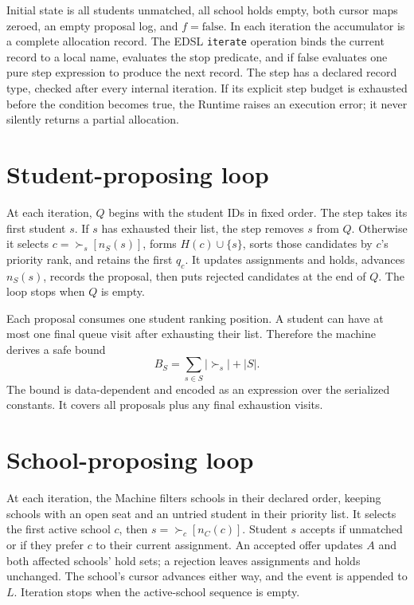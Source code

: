 \documentclass[11pt]{article}
\begin{document}
Initial state is all students unmatched, all school holds empty, both cursor maps zeroed, an empty proposal log, and $f=\text{false}$. In each iteration the accumulator is a complete allocation record. The EDSL \texttt{iterate} operation binds the current record to a local name, evaluates the stop predicate, and if false evaluates one pure step expression to produce the next record. The step has a declared record type, checked after every internal iteration. If its explicit step budget is exhausted before the condition becomes true, the Runtime raises an execution error; it never silently returns a partial allocation.

\section{Student-proposing loop}
At each iteration, $Q$ begins with the student IDs in fixed order. The step takes its first student $s$. If $s$ has exhausted their list, the step removes $s$ from $Q$. Otherwise it selects $c=\succ_s[n_S(s)]$, forms $H(c)\cup\{s\}$, sorts those candidates by $c$'s priority rank, and retains the first $q_c$. It updates assignments and holds, advances $n_S(s)$, records the proposal, then puts rejected candidates at the end of $Q$. The loop stops when $Q$ is empty.



Each proposal consumes one student ranking position. A student can have at most one final queue visit after exhausting their list. Therefore the machine derives a safe bound
\[
  B_S=\sum_{s\in S}|\succ_s|+|S|.
\]
The bound is data-dependent and encoded as an expression over the serialized constants. It covers all proposals plus any final exhaustion visits.

\section{School-proposing loop}
At each iteration, the Machine filters schools in their declared order, keeping schools with an open seat and an untried student in their priority list. It selects the first active school $c$, then $s=\succ_c[n_C(c)]$. Student $s$ accepts if unmatched or if they prefer $c$ to their current assignment. An accepted offer updates $A$ and both affected schools' hold sets; a rejection leaves assignments and holds unchanged. The school's cursor advances either way, and the event is appended to $L$. Iteration stops when the active-school sequence is empty.
\end{document}
